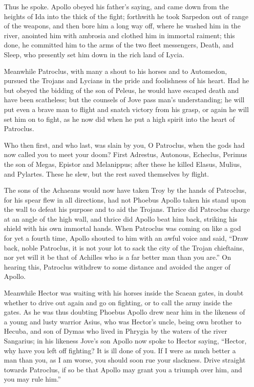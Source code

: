 Thus he spoke. Apollo obeyed his father’s saying, and came down from the
heights of Ida into the thick of the fight; forthwith he took Sarpedon out
of range of the weapons, and then bore him a long way off, where he washed
him in the river, anointed him with ambrosia and clothed him in immortal
raiment; this done, he committed him to the arms of the two fleet
messengers, Death, and Sleep, who presently set him down in the rich land
of Lycia.

Meanwhile Patroclus, with many a shout to his horses and to Automedon,
pursued the Trojans and Lycians in the pride and foolishness of his heart.
Had he but obeyed the bidding of the son of Peleus, he would have escaped
death and have been scatheless; but the counsels of Jove pass man’s
understanding; he will put even a brave man to flight and snatch victory
from his grasp, or again he will set him on to fight, as he now did when
he put a high spirit into the heart of Patroclus.

Who then first, and who last, was slain by you, O Patroclus, when the gods
had now called you to meet your doom? First Adrestus, Autonous, Echeclus,
Perimus the son of Megas, Epistor and Melanippus; after these he killed
Elasus, Mulius, and Pylartes. These he slew, but the rest saved themselves
by flight.

The sons of the Achaeans would now have taken Troy by the hands of
Patroclus, for his spear flew in all directions, had not Phoebus Apollo
taken his stand upon the wall to defeat his purpose and to aid the
Trojans. Thrice did Patroclus charge at an angle of the high wall, and
thrice did Apollo beat him back, striking his shield with his own immortal
hands. When Patroclus was coming on like a god for yet a fourth time,
Apollo shouted to him with an awful voice and said, “Draw back, noble
Patroclus, it is not your lot to sack the city of the Trojan chieftains,
nor yet will it be that of Achilles who is a far better man than you are.”
On hearing this, Patroclus withdrew to some distance and avoided the anger
of Apollo.

Meanwhile Hector was waiting with his horses inside the Scaean gates, in
doubt whether to drive out again and go on fighting, or to call the army
inside the gates. As he was thus doubting Phoebus Apollo drew near him in
the likeness of a young and lusty warrior Asius, who was Hector’s uncle,
being own brother to Hecuba, and son of Dymas who lived in Phrygia by the
waters of the river Sangarius; in his likeness Jove’s son Apollo now spoke
to Hector saying, “Hector, why have you left off fighting? It is ill done
of you. If I were as much better a man than you, as I am worse, you should
soon rue your slackness. Drive straight towards Patroclus, if so be that
Apollo may grant you a triumph over him, and you may rule him.”

